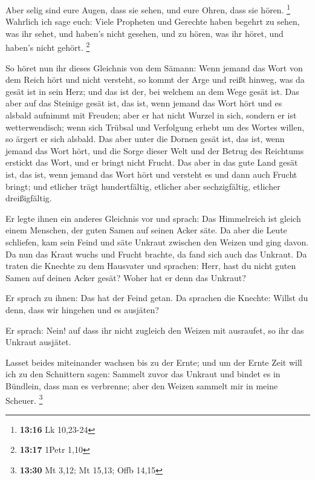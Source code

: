  Aber selig sind eure Augen, dass sie sehen, und eure
Ohren, dass sie hören. \footnote{\textbf{13:16} Lk 10,23-24}
 Wahrlich ich sage euch: Viele Propheten und Gerechte haben
begehrt zu sehen, was ihr sehet, und haben's nicht gesehen, und zu
hören, was ihr höret, und haben's nicht gehört. \footnote{\textbf{13:17}
  1Petr 1,10}

 So höret nun ihr dieses Gleichnis von dem Sämann:
 Wenn jemand das Wort von dem Reich hört und nicht
versteht, so kommt der Arge und reißt hinweg, was da gesät ist in sein
Herz; und das ist der, bei welchem an dem Wege gesät ist. 
Das aber auf das Steinige gesät ist, das ist, wenn jemand das Wort hört
und es alsbald aufnimmt mit Freuden;  aber er hat nicht
Wurzel in sich, sondern er ist wetterwendisch; wenn sich Trübsal und
Verfolgung erhebt um des Wortes willen, so ärgert er sich alsbald.
 Das aber unter die Dornen gesät ist, das ist, wenn jemand
das Wort hört, und die Sorge dieser Welt und der Betrug des Reichtums
erstickt das Wort, und er bringt nicht Frucht.  Das aber in
das gute Land gesät ist, das ist, wenn jemand das Wort hört und versteht
es und dann auch Frucht bringt; und etlicher trägt hundertfältig,
etlicher aber sechzigfältig, etlicher dreißigfältig.

 Er legte ihnen ein anderes Gleichnis vor und sprach: Das
Himmelreich ist gleich einem Menschen, der guten Samen auf seinen Acker
säte.  Da aber die Leute schliefen, kam sein Feind und säte
Unkraut zwischen den Weizen und ging davon.  Da nun das
Kraut wuchs und Frucht brachte, da fand sich auch das Unkraut.
 Da traten die Knechte zu dem Hausvater und sprachen: Herr,
hast du nicht guten Samen auf deinen Acker gesät? Woher hat er denn das
Unkraut?

 Er sprach zu ihnen: Das hat der Feind getan. Da sprachen
die Knechte: Willst du denn, dass wir hingehen und es ausjäten?

 Er sprach: Nein! auf dass ihr nicht zugleich den Weizen
mit ausraufet, so ihr das Unkraut ausjätet.

 Lasset beides miteinander wachsen bis zu der Ernte; und um
der Ernte Zeit will ich zu den Schnittern sagen: Sammelt zuvor das
Unkraut und bindet es in Bündlein, dass man es verbrenne; aber den
Weizen sammelt mir in meine Scheuer. \footnote{\textbf{13:30} Mt 3,12;
  Mt 15,13; Offb 14,15}

